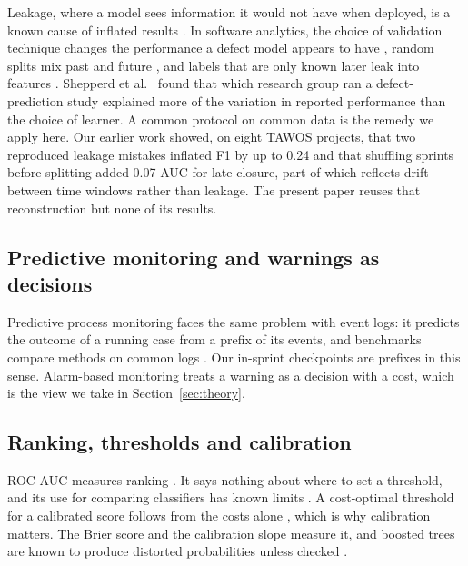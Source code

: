 \documentclass[journal]{IEEEtran}
\begin{document}
Leakage, where a model sees information it would not have when deployed, is a known cause of inflated results \cite{kaufman2012,kapoor2023}. In software analytics, the choice of validation technique changes the performance a defect model appears to have \cite{tanti2017}, random splits mix past and future \cite{bangash2020,falessi2020}, and labels that are only known later leak into features \cite{jimenez2019}. Shepperd et al.\ \cite{shepperd2014} found that which research group ran a defect-prediction study explained more of the variation in reported performance than the choice of learner. A common protocol on common data is the remedy we apply here. Our earlier work \cite{abusharkh2027} showed, on eight TAWOS projects, that two reproduced leakage mistakes inflated F1 by up to 0.24 and that shuffling sprints before splitting added 0.07 AUC for late closure, part of which reflects drift between time windows rather than leakage. The present paper reuses that reconstruction but none of its results.

\subsection{Predictive monitoring and warnings as decisions}

Predictive process monitoring \cite{marquez2018,teinemaa2019} faces the same problem with event logs: it predicts the outcome of a running case from a prefix of its events, and benchmarks compare methods on common logs \cite{difrancesco2018,teinemaa2019}. Our in-sprint checkpoints are prefixes in this sense. Alarm-based monitoring \cite{fahrenkrog2022} treats a warning as a decision with a cost, which is the view we take in Section~\ref{sec:theory}.

\subsection{Ranking, thresholds and calibration}

ROC-AUC measures ranking \cite{fawcett2006}. It says nothing about where to set a threshold, and its use for comparing classifiers has known limits \cite{hand2009,hernandez2012}. A cost-optimal threshold for a calibrated score follows from the costs alone \cite{elkan2001}, which is why calibration matters. The Brier score \cite{brier1950} and the calibration slope \cite{vancalster2019} measure it, and boosted trees are known to produce distorted probabilities unless checked \cite{niculescu2005}.
\end{document}
